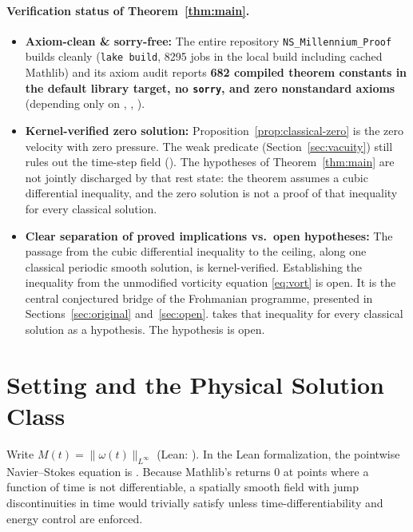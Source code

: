 \documentclass[11pt,a4paper]{article}
\theoremstyle{plain}
\theoremstyle{definition}
\theoremstyle{remark}
\begin{document}
\paragraph{Verification status of Theorem~\ref{thm:main}.}
\begin{itemize}
\item \textbf{Axiom-clean \& sorry-free:} The entire repository \texttt{NS\_Millennium\_Proof} builds cleanly (\texttt{lake build}, 8295 jobs in the local build including cached Mathlib) and its axiom audit reports \textbf{682 compiled theorem constants in the default library target, no \texttt{sorry}, and zero nonstandard axioms} (depending only on , , ).
\item \textbf{Kernel-verified zero solution:} Proposition~\ref{prop:classical-zero} is the zero velocity with zero pressure. The weak predicate  (Section~\ref{sec:vacuity}) still rules out the time-step field (). The hypotheses of Theorem~\ref{thm:main} are not jointly discharged by that rest state: the theorem assumes a cubic differential inequality, and the zero solution is not a proof of that inequality for every classical solution.
\item \textbf{Clear separation of proved implications vs.\ open hypotheses:} The passage from the cubic differential inequality to the ceiling, along one classical periodic smooth solution, is kernel-verified. Establishing the inequality from the unmodified vorticity equation \eqref{eq:vort} is open. It is the central conjectured bridge of the Frohmanian programme, presented in Sections~\ref{sec:original} and~\ref{sec:open}.  takes that inequality for every classical solution as a hypothesis. The hypothesis is open.
\end{itemize}

\section{Setting and the Physical Solution Class}\label{sec:setting}

Write $M(t)=\|\omega(t)\|_{L^\infty}$ (Lean: ). In the Lean formalization, the pointwise Navier--Stokes equation is . Because Mathlib's  returns $0$ at points where a function of time is not differentiable, a spatially smooth field with jump discontinuities in time would trivially satisfy  unless time-differentiability and energy control are enforced.
\end{document}
